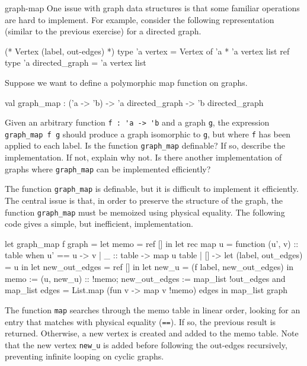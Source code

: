 %
\begin{exercise}{graph-map}
One issue with graph data structures is that some familiar operations are hard to implement.  For
example, consider the following representation (similar to the previous exercise) for a directed graph.

\begin{ocaml}
(* Vertex (label, out-edges) *)
type 'a vertex = Vertex of 'a * 'a vertex list ref
type 'a directed_graph = 'a vertex list
\end{ocaml}
%
Suppose we want to define a polymorphic map function on graphs.

\begin{ocaml}
val graph_map : ('a -> 'b) -> 'a directed_graph -> 'b directed_graph
\end{ocaml}
%
Given an arbitrary function \hbox{\lstinline/f : 'a -> 'b/} and a graph \hbox{\lstinline/g/}, the expression
\hbox{\lstinline/graph_map f g/} should produce a graph isomorphic to \hbox{\lstinline/g/}, but where
\hbox{\lstinline/f/} has been applied to each label.  Is the function \hbox{\lstinline/graph_map/} definable?  If
so, describe the implementation.  If not, explain why not.  Is there another implementation of
graphs where \hbox{\lstinline/graph_map/} can be implemented efficiently?

\begin{answer}\ifanswers
The function \hbox{\lstinline/graph_map/} is definable, but it is difficult to implement it efficiently.
The central issue is that, in order to preserve the structure of the graph, the function
\hbox{\lstinline/graph_map/} must be memoized using physical equality.  The following code gives a simple,
but inefficient, implementation.

\begin{ocamlnum}
let graph_map f graph =
   let memo = ref [] in
   let rec map u = function
      (u', v) :: table when u' == u -> v
    | _ :: table -> map u table
    | [] ->
       let (label, out_edges) = u in
       let new_out_edges = ref [] in
       let new_u = (f label, new_out_edges) in
       memo := (u, new_u) :: !memo;
       new_out_edges := map_list !out_edges
   and map_list edges =
      List.map (fun v -> map v !memo) edges
   in
   map_list graph
\end{ocamlnum}
%
The function \hbox{\lstinline/map/} searches through the memo table in linear order, looking for an entry
that matches with physical equality (\hbox{\lstinline/==/}).  If so, the previous result is returned.
Otherwise, a new vertex is created and added to the memo table.  Note that the new vertex
\hbox{\lstinline/new_u/} is added before following the out-edges recursively, preventing infinite looping
on cyclic graphs.


\end{answer}
\end{exercise}
